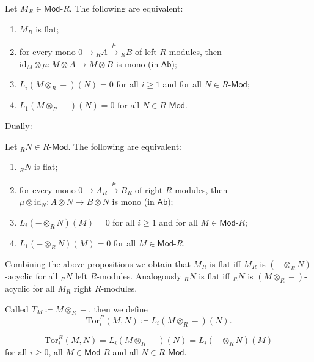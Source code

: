 \begin{prop}
	Let $M_R \in \mathsf{Mod}\text{-}R$.
	The following are equivalent:
	\begin{enumerate}
		\item $M_R$ is flat;
		\item for every mono $0 \to {}_RA \xrightarrow{\mu} {}_RB$ of left $R$-modules, then
			$\mathrm{id}_{ M } \otimes \mu\colon M \otimes A \to M \otimes B$
			is mono (in $\mathsf{Ab}$);
		\item $L_i \left( M \otimes_R - \right) (N) = 0$ for all $i \geq 1$ and for all $N \in R\text{-}\mathsf{Mod}$;
		\item $L_1 \left( M \otimes_R - \right) (N) = 0$ for all $N \in R\text{-}\mathsf{Mod}$.
	\end{enumerate}
\end{prop} 
Dually:
\begin{prop}
	Let ${}_RN \in R \text{-}\mathsf{Mod}$.
	The following are equivalent:
	\begin{enumerate}
		\item ${}_RN$ is flat;
		\item for every mono $0 \to A_R \xrightarrow{\mu} B_R$ of right $R$-modules, then
			$\mu \otimes \mathrm{id}_{ N } \colon A \otimes N \to B \otimes N$
			is mono (in $\mathsf{Ab}$);
		\item $L_i \left( - \otimes_R N\right) (M) = 0$ for all $i \geq 1$ and for all $M \in \mathsf{Mod}\text{-}R$;
		\item $L_1 \left( - \otimes_R N \right) (M) = 0$ for all $M \in \mathsf{Mod}\text{-}R$.
	\end{enumerate}
\end{prop} 

\begin{rem}[]
	Combining the above propositions we obtain that
	$M_R$ is flat iff $M_R$ is $\left( - \otimes_R N \right)$-acyclic for all ${}_R N$ left $R$-modules.
	Analogously ${}_RN$ is flat iff ${}_RN$ is $\left( M \otimes_R - \right)$-acyclic for all $M_R$ right $R$-modules.
\end{rem}

\begin{defn}[Notation]
	Called $T_M \coloneqq M \otimes_R -$, then we define
	\begin{equation}
		\mathrm{Tor}^R_i (M,N) \coloneqq L_i \left( M \otimes_R - \right) (N)
	.\end{equation} 
\end{defn}

\begin{thm}
	\begin{equation}
		\mathrm{Tor}_i^R(M,N) = L_i \left( M \otimes_R - \right)(N) =
		L_i \left( - \otimes_R N \right)(M)
	\end{equation}
	for all $i \geq 0$, all $M \in \mathsf{Mod}\text{-}R$ and all $N \in R\text{-}\mathsf{Mod}$.
\end{thm}

